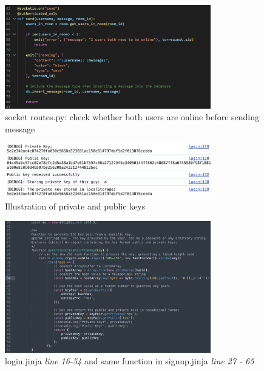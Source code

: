 \documentclass[12pt]{article}
\begin{document}
\begin{enumerate}
		\begin{figure}[H]
                \centering
                \includegraphics[width=0.8\textwidth]{zzrgraphs/socket_send.png}
                \caption{socket routes.py: check whether both users are online before sending message}
                \label{send}
            \end{figure}

            \begin{figure}[H]
                \centering
                \includegraphics[width=0.8\textwidth]{graphs/show_keys.jpg}
                \caption{Illustration of private and public keys}
                \label{show_keys}
            \end{figure}

            \begin{figure}[H]
                \centering{}
                \includegraphics[width=0.8\textwidth]{graphs/generate_key_pairs.jpg}
                \caption{login.jinja \textit{line 16-54} and same function in signup.jinja \textit{line 27 - 65}}
                \label{generate_key_pairs}
            \end{figure}


\end{enumerate}
\end{document}
